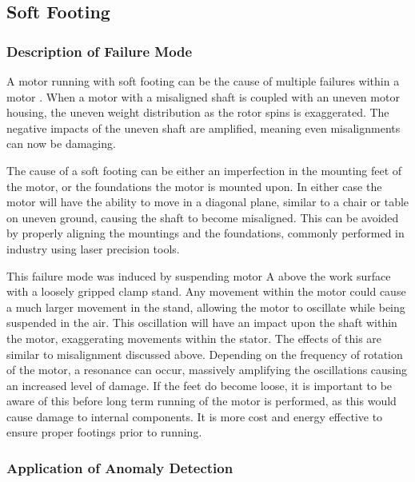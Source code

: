 
\subsection{Soft Footing}

\subsubsection{Description of Failure Mode}
A motor running with soft footing can be the cause of multiple failures within a motor \cite{finley1999analytical}. When a motor with a misaligned shaft is coupled with an uneven motor housing, the uneven weight distribution as the rotor spins is exaggerated. The negative impacts of the uneven shaft are amplified, meaning even misalignments can now be damaging. 

The cause of a soft footing can be either an imperfection in the mounting feet of the motor, or the foundations the motor is mounted upon. In either case the motor will have the ability to move in a diagonal plane, similar to a chair or table on uneven ground, causing the shaft to become misaligned. This can be avoided by properly aligning the mountings and the foundations, commonly performed in industry using laser precision tools. 

This failure mode was induced by suspending motor A above the work surface with a loosely gripped clamp stand. Any movement within the motor could cause a much larger movement in the stand, allowing the motor to oscillate while being suspended in the air. This oscillation will have an impact upon the shaft within the motor, exaggerating movements within the stator. The effects of this are similar to misalignment discussed above. Depending on the frequency of rotation of the motor, a resonance can occur, massively amplifying the oscillations causing an increased level of damage. If the feet do become loose, it is important to be aware of this before long term running of the motor is performed, as this would cause damage to internal components. It is more cost and energy effective to ensure proper footings prior to running.

\subsubsection{Application of Anomaly Detection}


